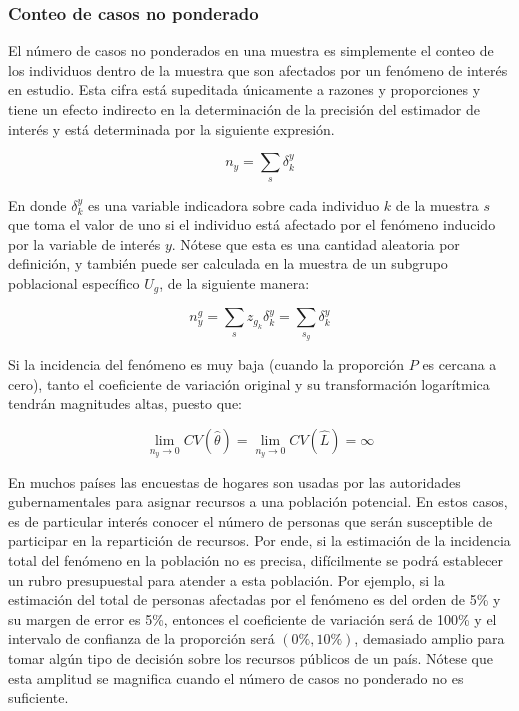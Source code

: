 \documentclass[
  10pt,
  spanish,
]{book}
\begin{document}
\hypertarget{conteo-de-casos-no-ponderado}{%
\subsubsection*{Conteo de casos no ponderado}\label{conteo-de-casos-no-ponderado}}

El número de casos no ponderados en una muestra es simplemente el conteo de los individuos dentro de la muestra que son afectados por un fenómeno de interés en estudio. Esta cifra está supeditada únicamente a razones y proporciones y tiene un efecto indirecto en la determinación de la precisión del estimador de interés y está determinada por la siguiente expresión.

\[
n_y = \sum_{s}\delta_{k}^y
\]

En donde \(\delta_{k}^y\) es una variable indicadora sobre cada individuo \(k\) de la muestra \(s\) que toma el valor de uno si el individuo está afectado por el fenómeno inducido por la variable de interés \(y\). Nótese que esta es una cantidad aleatoria por definición, y también puede ser calculada en la muestra de un subgrupo poblacional específico \(U_g\), de la siguiente manera:

\[
n_y^g = \sum_{s}z_{g_k}\delta_{k}^y = \sum_{s_g}\delta_{k}^y
\]

Si la incidencia del fenómeno es muy baja (cuando la proporción \(P\) es cercana a cero), tanto el coeficiente de variación original y su transformación logarítmica tendrán magnitudes altas, puesto que:

\[
\lim_{n_y \rightarrow 0} CV(\hat \theta) = 
\lim_{n_y \rightarrow 0} CV(\hat L) = \infty
\]

En muchos países las encuestas de hogares son usadas por las autoridades gubernamentales para asignar recursos a una población potencial. En estos casos, es de particular interés conocer el número de personas que serán susceptible de participar en la repartición de recursos. Por ende, si la estimación de la incidencia total del fenómeno en la población no es precisa, difícilmente se podrá establecer un rubro presupuestal para atender a esta población. Por ejemplo, si la estimación del total de personas afectadas por el fenómeno es del orden de 5\% y su margen de error es 5\%, entonces el coeficiente de variación será de 100\% y el intervalo de confianza de la proporción será \((0 \%, 10 \%)\), demasiado amplio para tomar algún tipo de decisión sobre los recursos públicos de un país. Nótese que esta amplitud se magnifica cuando el número de casos no ponderado no es suficiente.
\end{document}
